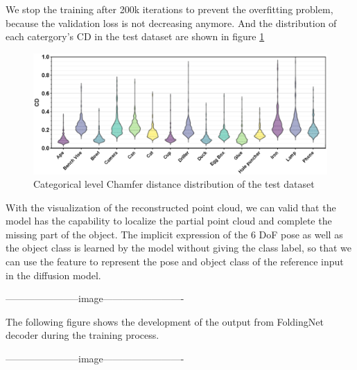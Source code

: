 \documentclass[12pt,DIV14,BCOR12mm,a4paper,footinclude=false,headinclude,parskip=half-,twoside,openright,cleardoublepage=empty,toc=index,bibliography=totoc,listof=totoc]{scrreprt}
\numberwithin{equation}{chapter}
\begin{document}
We stop the training after 200k iterations to prevent the overfitting problem, because the validation loss is not decreasing anymore. And the distribution of each catergory's CD in the test dataset are shown in figure \ref{img:cd_cate} 

\begin{figure}[h]
	\centering
	\includegraphics[width=1.\textwidth]{img/cd_category.eps}
	\caption{Categorical level Chamfer distance distribution of the test dataset}
	\label{img:cd_cate}
\end{figure}



With the visualization of the reconstructed point cloud, we can valid that the model has the capability to localize the partial point cloud and complete the missing part of the object. The implicit expression of the 6 DoF pose as well as the object class is learned by the model without giving the class label, so that we can use the feature to represent the pose and object class of the reference input in the diffusion model.

-----------------------image-------------------------

The following figure shows the development of the output from FoldingNet decoder during the training process.

-----------------------image-------------------------
\end{document}
